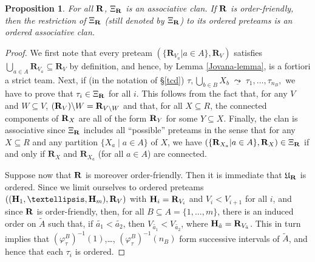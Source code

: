 \documentclass[11pt]{article}
\newtheorem{proposition}[theo]{Proposition}
\theoremstyle{definition}
\numberwithin{equation}{section}
\numberwithin{equation}{section}
\newcommand{\uline}[1]{\underline{#1}}
\newcommand{\inc}{\subseteq}
\newcommand{\set}[1]{\{#1\}}
\newcommand{\setc}[2]{\set{#1 \mid #2}}
\newcommand{\Union}{\bigcup}		%
\newcommand{\hyper}[1]{{\bf #1}}
\newcommand{\clandec}{\;\uline{\leadsto}\;}
\begin{document}
 
 \begin{proposition} \label{Xi-K-strict-associative}
For all $\hyper{R}$, $\Xi_\hyper{R}$ is an associative clan.  If $\hyper{R}$ is order-friendly, then the restriction of $\Xi_\hyper{R}$ (still denoted by $\Xi_\hyper{R}$) to its ordered preteams is an ordered associative clan.
\end{proposition}
\begin{proof}  
We first note that 
every preteam $(\{\mathbf{R}_{V_a} | a \in A\}, \mathbf{R}_V)$ satisfies $\Union_{a\in A} \mathbf{R}_{V_a} \subseteq \mathbf{R}_V$ by definition, and hence, by  Lemma \ref{Jovana-lemma}, is a fortiori a strict team. Next, if (in the notation of \S\ref{tcd})
$\tau, \Union_{b\in B}X_b\clandec \tau_1,\ldots,\tau_{n_B},$ we have to prove that $\tau_i\in \Xi_\hyper{R}$ for all $i$. This follows from the fact that, for any $V$ and $W\inc V$, $(\hyper{R}_V)\backslash W=\hyper{R}_{V\backslash W}$ and that, for all $X\inc R$, the connected components of $\hyper{R}_X$ are all of the form $\hyper{R}_Y$ for some $Y\inc X$.  Finally, the clan is associative since $\Xi_\hyper{R}$ includes all ``possible'' preteams in the sense that  for any $X\inc R$ and any partition $\setc{X_a}{a\in A}$ of $X$, we have $(\{\mathbf{R}_{X_a} | a \in A\}, \mathbf{R}_X)\in  \Xi_\hyper{R}$ if and only if  $\mathbf{R}_X$ and $\mathbf{R}_{X_a}$ (for all $a\in A$) are connected.

Suppose now that $\hyper{R}$ is moreover order-friendly. Then  it is immediate that $\mathfrak{U}_{\hyper{R}}$ is ordered. Since we limit ourselves to ordered preteams  $((\hyper{H}_1,\ldots,\hyper{H}_m),\hyper{R}_V)$ with  $\hyper{H}_i=\hyper{R}_{V_i}$ and $V_i<V_{i+1}$ for all $i$, and since $\hyper{R}$ is order-friendly, then, for all $B\inc A=\set{1,\ldots,m}$, there is an induced order on $\tilde{A}$ such that, if $\tilde{a_1}<\tilde{a_2}$, then $V_{\tilde{a_1}}<V_{\tilde{a_2}}$, where $\hyper{H}_{\tilde{a}}=\hyper{R}_{V_{\tilde{a}}}$. This in turn implies that $(\varphi^B_\tau)^{-1}(1)$,\ldots,  $(\varphi^B_\tau)^{-1}(n_B)$ form successive intervals of $\tilde{A}$, and hence that each $\tau_i$ is ordered.
\end{proof}
\end{document}
